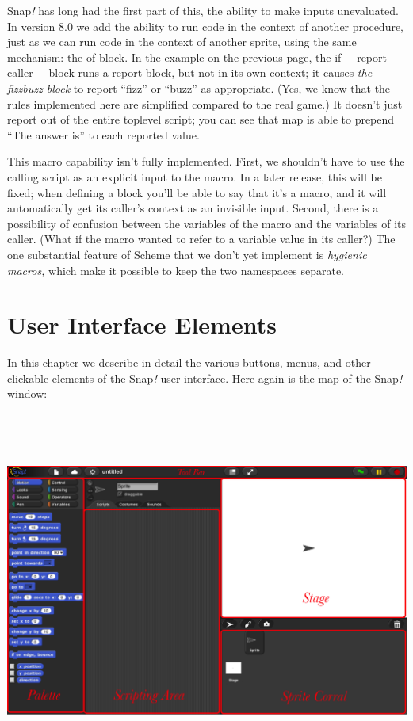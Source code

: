 Snap\emph{!} has long had the first part of this, the ability to make
inputs unevaluated. In version 8.0 we add the ability to run code in the
context of another procedure, just as we can run code in the context of
another sprite, using the same mechanism: the of block. In the example
on the previous page, the if \_ report \_ caller \_ block runs a report
block, but not in its own context; it causes \emph{the fizzbuzz block}
to report ``fizz'' or ``buzz'' as appropriate. (Yes, we know that the
rules implemented here are simplified compared to the real game.) It
doesn't just report out of the entire toplevel script; you can see that
map is able to prepend ``The answer is'' to each reported value.

This macro capability isn't fully implemented. First, we shouldn't have
to use the calling script as an explicit input to the macro. In a later
release, this will be fixed; when defining a block you'll be able to say
that it's a macro, and it will automatically get its caller's context as
an invisible input. Second, there is a possibility of confusion between
the variables of the macro and the variables of its caller. (What if the
macro wanted to refer to a variable value in its caller?) The one
substantial feature of Scheme that we don't yet implement is
\emph{hygienic macros,} which make it possible to keep the two
namespaces separate.

\section{User Interface Elements}\label{user-interface-elements}

In this chapter we describe in detail the various buttons, menus, and
other clickable elements of the Snap\emph{!} user interface. Here again
is the map of the Snap\emph{!} window:

\includegraphics[width=7.49442in,height=4.66319in]{media/image993.png}

